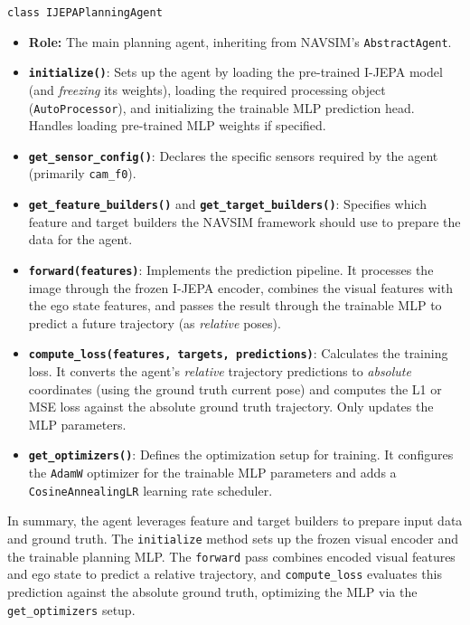 \documentclass{article}
\begin{document}
\texttt{class IJEPAPlanningAgent}
\begin{itemize}
    \item \textbf{Role:} The main planning agent, inheriting from NAVSIM's \texttt{AbstractAgent}.
    \item \textbf{\texttt{initialize()}}: Sets up the agent by loading the pre-trained I-JEPA model (and \emph{freezing} its weights), loading the required processing object (\texttt{AutoProcessor}), and initializing the trainable MLP prediction head. Handles loading pre-trained MLP weights if specified.
    \item \textbf{\texttt{get\_sensor\_config()}}: Declares the specific sensors required by the agent (primarily \texttt{cam\_f0}).
    \item \textbf{\texttt{get\_feature\_builders()}} and \textbf{\texttt{get\_target\_builders()}}: Specifies which feature and target builders the NAVSIM framework should use to prepare the data for the agent.
    \item \textbf{\texttt{forward(features)}}: Implements the prediction pipeline. It processes the image through the frozen I-JEPA encoder, combines the visual features with the ego state features, and passes the result through the trainable MLP to predict a future trajectory (as \emph{relative} poses).
    \item \textbf{\texttt{compute\_loss(features, targets, predictions)}}: Calculates the training loss. It converts the agent's \emph{relative} trajectory predictions to \emph{absolute} coordinates (using the ground truth current pose) and computes the L1 or MSE loss against the absolute ground truth trajectory. Only updates the MLP parameters.
    \item \textbf{\texttt{get\_optimizers()}}: Defines the optimization setup for training. It configures the \texttt{AdamW} optimizer for the trainable MLP parameters and adds a \texttt{CosineAnnealingLR} learning rate scheduler.

\end{itemize}

\vspace{1em} %
In summary, the agent leverages feature and target builders to prepare input data and ground truth. The \texttt{initialize} method sets up the frozen visual encoder and the trainable planning MLP. The \texttt{forward} pass combines encoded visual features and ego state to predict a relative trajectory, and \texttt{compute\_loss} evaluates this prediction against the absolute ground truth, optimizing the MLP via the \texttt{get\_optimizers} setup.
\end{document}
